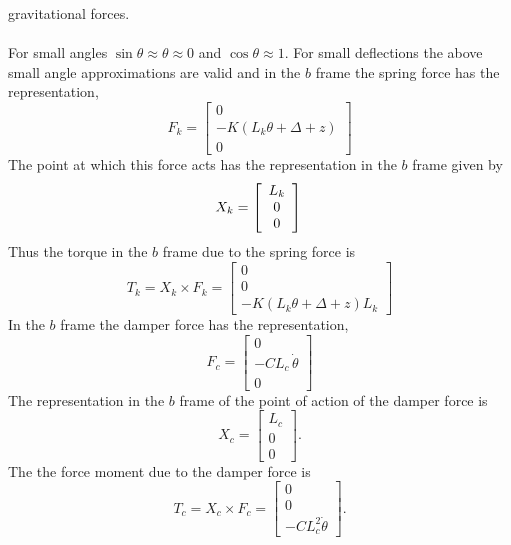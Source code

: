 \documentclass[graybox,envcountchap,sectrefs]{svmonoMuga}
\begin{document}
gravitational forces.
\\
\\
For small angles $\sin{\theta}\approx \theta\approx 0$ and $\cos{\theta}\approx 1$. For small deflections the above small angle approximations are valid and in the $b$ frame the 
spring force has the representation,
\begin{equation}
F_k=\left[\begin{array}{c}
0 \\
-K(L_k\theta+\Delta+z)\\
0\end{array}\right]
\end{equation}
The point at which this force acts has the representation in the $b$ frame given by
\[
X_k=\left[\begin{array}{cc}
L_k\\
0\\
0\end{array}\right]\\
\]
Thus the torque in the $b$ frame due to the spring force is
\begin{equation}
T_k=X_k\times F_k=\left[\begin{array}{c}
0\\
0\\
-K (L_k\theta+\Delta+z)L_k\end{array}\right]
\end{equation}
In the $b$ frame the damper force has the representation,
\begin{equation}
F_c=\left[\begin{array}{c}
0\\
-CL_c\,\dot{\theta}\\
0\end{array}\right]
\end{equation}
The representation in the $b$ frame of the point of action of the damper force is
\[
X_c=\left[\begin{array}{c}
L_c\\
0\\
0\end{array}\right].
\]
The the force moment due to the damper force is
\begin{equation}
T_c=X_c\times F_c
=\left[\begin{array}{c}
0\\
0\\
-CL_c^2\dot{\theta}\end{array}\right].
\end{equation}
\end{document}
